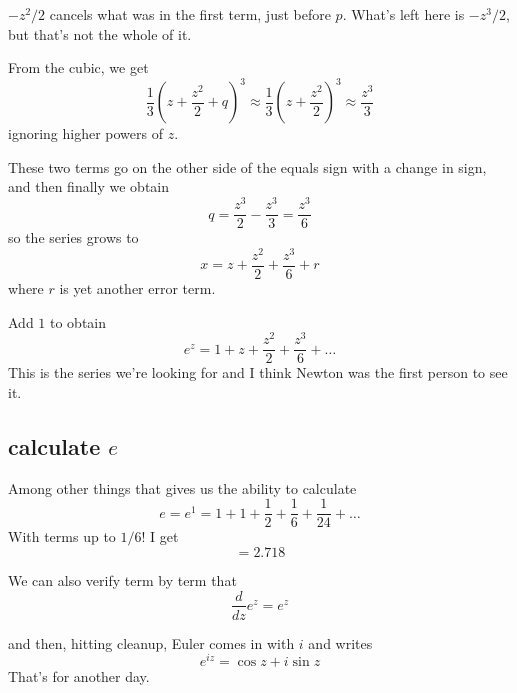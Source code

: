 \documentclass[11pt, oneside]{article}
\begin{document}
$-z^2/2$ cancels what was in the first term, just before $p$.  What's left here is $-z^3/2$, but that's not the whole of it.

From the cubic, we get 
\[ \frac{1}{3} (z +  \frac{z^2}{2} + q)^3 \approx \frac{1}{3}(z + \frac{z^2}{2})^3 \approx \frac{z^3}{3} \]
ignoring higher powers of $z$.

These two terms go on the other side of the equals sign with a change in sign, and then finally we obtain
\[ q = \frac{z^3}{2} - \frac{z^3}{3} = \frac{z^3}{6} \]
so the series grows to
\[ x = z +  \frac{z^2}{2} + \frac{z^3}{6} + r \]
where $r$ is yet another error term.

Add $1$ to obtain
\[ e^z = 1 + z +  \frac{z^2}{2} + \frac{z^3}{6} + \dots \]
This is the series we're looking for and I think Newton was the first person to see it.

\subsection*{calculate $e$}

Among other things that gives us the ability to calculate 
\[ e = e^1 = 1 + 1 + \frac{1}{2} + \frac{1}{6} + \frac{1}{24} + \dots \]
With terms up to $1/6!$ I get
\[ = 2.718 \]

We can also verify term by term that
\[ \frac{d}{dz} e^z = e^z \]

and then, hitting cleanup, Euler comes in with $i$ and writes
\[ e^{iz} = \cos z + i \sin z \]
That's for another day.
\end{document}
